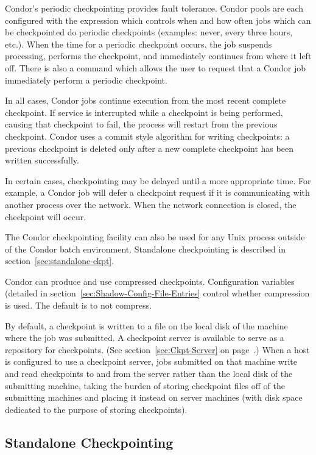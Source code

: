 Condor's periodic checkpointing provides fault tolerance.  Condor
pools are each configured with the 
expression which controls when and how often jobs which can be
checkpointed do periodic checkpoints (examples: never, every three
hours, etc.).  When the time for a periodic checkpoint occurs, the job
suspends processing, performs the checkpoint, and immediately
continues from where it left off.  There is also a  command
which allows the user to request that a Condor job immediately perform
a periodic checkpoint.

In all cases, Condor jobs continue execution from the most recent
complete checkpoint.  If service is interrupted while a checkpoint is
being performed, causing that checkpoint to fail, the process will
restart from the previous checkpoint.  Condor uses a commit style
algorithm for writing checkpoints: a previous checkpoint is deleted
only after a new complete checkpoint has been written successfully.

In certain cases, checkpointing may be delayed until a more appropriate
time.  For example, a Condor job will defer a checkpoint request if
it is communicating with another process over the network.  When the
network connection is closed, the checkpoint will occur.

The Condor checkpointing facility can also be used for any Unix process
outside of the Condor batch environment. Standalone checkpointing
is described in section~\ref{sec:standalone-ckpt}.

Condor can produce and use compressed checkpoints.
Configuration variables (detailed in 
section~\ref{sec:Shadow-Config-File-Entries}
control whether compression is used.
The default is to not compress.

By default, a checkpoint is written to a file on the local disk of the
machine where the job was submitted.  A checkpoint server is available
to serve as a repository for checkpoints.  (See
section~\ref{sec:Ckpt-Server} on page~\pageref{sec:Ckpt-Server}.)
When a host is configured to use a checkpoint server, jobs submitted
on that machine write and read checkpoints to and from the server
rather than the local disk of the submitting machine, taking the
burden of storing checkpoint files off of the submitting machines and
placing it instead on server machines (with disk space dedicated to
the purpose of storing checkpoints).

\subsection{\label{sec:standalone-ckpt}Standalone Checkpointing}

